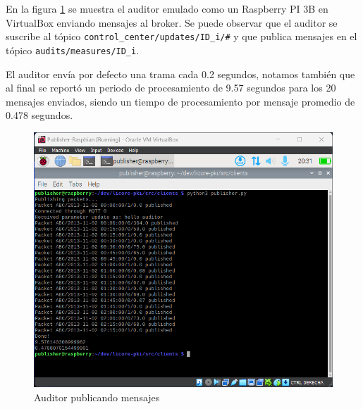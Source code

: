 \documentclass{article}
\begin{document}
        En la figura \ref{fig:auditor} se muestra el auditor emulado como un Raspberry PI 3B en VirtualBox enviando mensajes al broker. Se puede observar que el auditor se suscribe al tópico \texttt{control\_center/updates/ID\_i/\#} y que publica mensajes en el tópico \texttt{audits/measures/ID\_i}.

        El auditor envía por defecto una trama cada 0.2 segundos, notamos también que al final se reportó un periodo de procesamiento de 9.57 segundos para los 20 mensajes enviados, siendo un tiempo de procesamiento por mensaje promedio de 0.478 segundos.
        \begin{figure}[!htbp]
            \centering
            \includegraphics[scale=0.6]{publisher.png}
            \caption{Auditor publicando mensajes}
            \label{fig:auditor}
        \end{figure}
\end{document}
